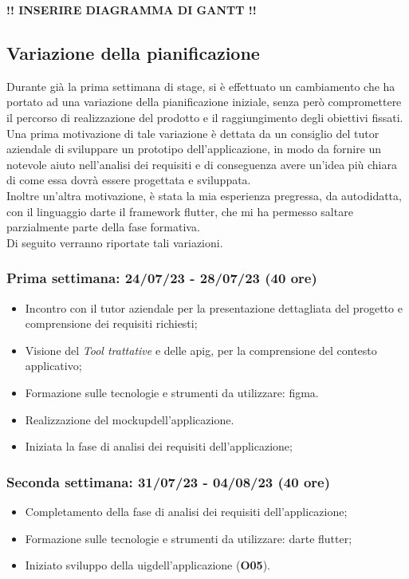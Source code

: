 \textbf{!! INSERIRE DIAGRAMMA DI GANTT !!}

\subsection{Variazione della pianificazione}
\label{subsec:variazione-pianificazione}

Durante già la prima settimana di stage, si è  effettuato un cambiamento che ha portato ad una variazione della pianificazione iniziale, senza però compromettere il percorso di realizzazione del prodotto e il raggiungimento degli obiettivi fissati.\\
Una prima motivazione di tale variazione è dettata da un consiglio del tutor aziendale di sviluppare un prototipo dell'applicazione, in modo da fornire un notevole aiuto nell'analisi dei requisiti e di conseguenza avere un'idea più chiara di come essa dovrà essere progettata e sviluppata.\\
Inoltre un'altra motivazione, è stata la mia esperienza pregressa, da autodidatta, con il linguaggio \gls{dart}\glsoccur e il framework \gls{flutter}\glsoccur, che mi ha permesso saltare parzialmente parte della fase formativa.\\
Di seguito verranno riportate tali variazioni.

\subsubsection{Prima settimana: 24/07/23 - 28/07/23 (40 ore)}
    \begin{itemize}
        \item Incontro con il tutor aziendale per la presentazione dettagliata del progetto e comprensione dei requisiti richiesti;
        \item Visione del \emph{Tool trattative} e delle \gls{apig}\glsoccur, per la comprensione del contesto applicativo;
        \item Formazione sulle tecnologie e strumenti da utilizzare: \gls{figma}\glsoccur.
        \item Realizzazione del \gls{mockup}\glsoccur dell'applicazione.
        \item Iniziata la fase di analisi dei requisiti dell'applicazione;
    \end{itemize}
\subsubsection{Seconda settimana: 31/07/23 - 04/08/23 (40 ore)}
    \begin{itemize}
        \item Completamento della fase di analisi dei requisiti dell'applicazione;
        \item Formazione sulle tecnologie e strumenti da utilizzare: \gls{dart}\glsoccur e \gls{flutter}\glsoccur;
        \item Iniziato sviluppo  della \gls{uig}\glsoccur dell'applicazione (\textbf{O05}).
    \end{itemize}
